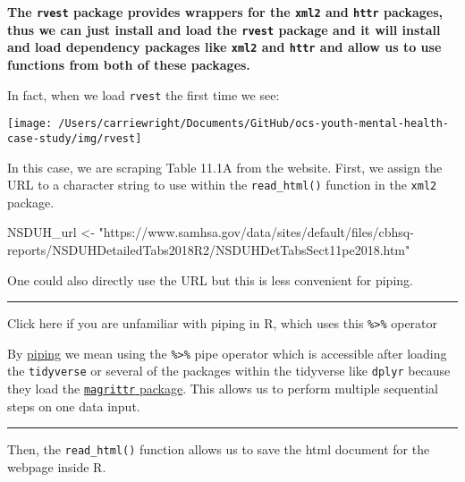 \documentclass[
]{article}
\newenvironment{Shaded}{\begin{snugshade}}{\end{snugshade}}
\newcommand{\NormalTok}[1]{#1}
\newcommand{\StringTok}[1]{\textcolor[rgb]{0.31,0.60,0.02}{#1}}
\begin{document}
\textbf{The \texttt{rvest} package provides wrappers for the
\texttt{xml2} and \texttt{httr} packages, thus we can just install and
load the \texttt{rvest} package and it will install and load dependency
packages like \texttt{xml2} and \texttt{httr} and allow us to use
functions from both of these packages.}

In fact, when we load \texttt{rvest} the first time we see:

\begin{center}\texttt{[image: /Users/carriewright/Documents/GitHub/ocs-youth-mental-health-case-study/img/rvest]} \end{center}

In this case, we are scraping Table 11.1A from the website. First, we
assign the URL to a character string to use within the
\texttt{read\_html()} function in the \texttt{xml2} package.

\begin{Shaded}
\begin{Highlighting}[]
\NormalTok{NSDUH_url <-}\StringTok{ "https://www.samhsa.gov/data/sites/default/files/cbhsq-reports/NSDUHDetailedTabs2018R2/NSDUHDetTabsSect11pe2018.htm"}
\end{Highlighting}
\end{Shaded}

One could also directly use the URL but this is less convenient for
piping.

\begin{center}\rule{0.5\linewidth}{0.5pt}\end{center}

Click here if you are unfamiliar with piping in R, which uses this
\texttt{\%\textgreater{}\%} operator

By
\href{https://cran.r-project.org/web/packages/magrittr/vignettes/magrittr.html}{piping}
we mean using the \texttt{\%\textgreater{}\%} pipe operator which is
accessible after loading the \texttt{tidyverse} or several of the
packages within the tidyverse like \texttt{dplyr} because they load the
\href{https://cran.r-project.org/web/packages/magrittr/vignettes/magrittr.html}{\texttt{magrittr}
package}. This allows us to perform multiple sequential steps on one
data input.

\begin{center}\rule{0.5\linewidth}{0.5pt}\end{center}

Then, the \texttt{read\_html()} function allows us to save the html
document for the webpage inside R.
\end{document}
